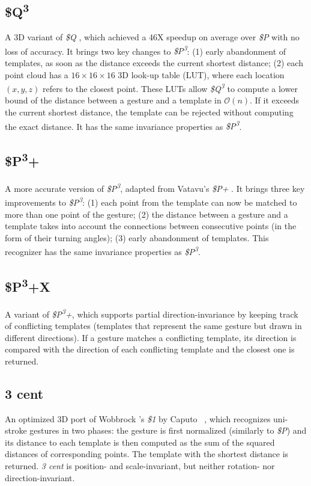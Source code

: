 \subsection{\$Q\texorpdfstring{\textsuperscript{3}}{3}}
A 3D variant of \textit{\$Q} \cite{Vatavu:2018}, which achieved a 46X speedup on average over \textit{\$P} with no loss of accuracy. It brings two key changes to \textit{\$P\textsuperscript{3}}: (1) early abandonment of templates, as soon as the distance exceeds the current shortest distance; (2) each point cloud has a $16{\times}16{\times}16$ 3D look-up table (LUT), where each location $(x, y, z)$ refers to the closest point. These LUTs allow \textit{\$Q\textsuperscript{3}} to compute a lower bound of the distance between a gesture and a template in $\mathcal{O}(n)$. If it exceeds the current shortest distance, the template can be rejected without computing the exact distance. It has the same invariance properties as \textit{\$P\textsuperscript{3}}.
    
\subsection{\$P\texorpdfstring{\textsuperscript{3}}{3}+}
A more accurate version of \textit{\$P\textsuperscript{3}}, adapted from Vatavu's \textit{\$P+} \cite{Vatavu:2017a}. It brings three key improvements to \textit{\$P\textsuperscript{3}}: (1) each point from the template can now be matched to more than one point of the gesture; (2) the distance between a gesture and a template takes into account the connections between consecutive points (in the form of their turning angles); (3) early abandonment of templates. This recognizer has the same invariance properties as \textit{\$P\textsuperscript{3}}.

\subsection{\$P\texorpdfstring{\textsuperscript{3}}{3}+X}
A variant of \textit{\$P\textsuperscript{3}+}, which supports partial direction-invariance by keeping track of conflicting templates (\ie templates that represent the same gesture but drawn in different directions). If a gesture matches a conflicting template, its direction is compared with the direction of each conflicting template and the closest one is returned.

\subsection{3 cent}
An optimized 3D port of Wobbrock \etal's \textit{\$1} \cite{Wobbrock:2007} by Caputo \etal~\cite{Caputo:2017}, which recognizes uni-stroke gestures in two phases: the gesture is first normalized (similarly to \textit{\$P}) and its distance to each template is then computed as the sum of the squared distances of corresponding points. The template with the shortest distance is returned. \textit{3 cent} is position- and scale-invariant, but neither rotation- nor direction-invariant. 

